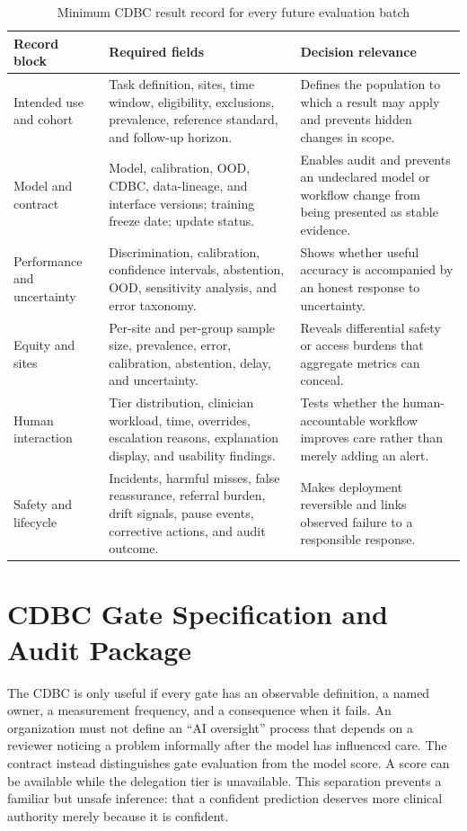 \documentclass[conference]{IEEEtran}
\begin{document}
\begin{table}[t]
\caption{Minimum CDBC result record for every future evaluation batch}
\label{tab:record}
\centering
\footnotesize
\begin{tabular}{p{}p{}p{}}
\toprule
\textbf{Record block} & \textbf{Required fields} & \textbf{Decision relevance}\\
\midrule
Intended use and cohort & Task definition, sites, time window, eligibility, exclusions, prevalence, reference standard, and follow-up horizon. & Defines the population to which a result may apply and prevents hidden changes in scope.\\
Model and contract & Model, calibration, OOD, CDBC, data-lineage, and interface versions; training freeze date; update status. & Enables audit and prevents an undeclared model or workflow change from being presented as stable evidence.\\
Performance and uncertainty & Discrimination, calibration, confidence intervals, abstention, OOD, sensitivity analysis, and error taxonomy. & Shows whether useful accuracy is accompanied by an honest response to uncertainty.\\
Equity and sites & Per-site and per-group sample size, prevalence, error, calibration, abstention, delay, and uncertainty. & Reveals differential safety or access burdens that aggregate metrics can conceal.\\
Human interaction & Tier distribution, clinician workload, time, overrides, escalation reasons, explanation display, and usability findings. & Tests whether the human-accountable workflow improves care rather than merely adding an alert.\\
Safety and lifecycle & Incidents, harmful misses, false reassurance, referral burden, drift signals, pause events, corrective actions, and audit outcome. & Makes deployment reversible and links observed failure to a responsible response.\\
\bottomrule
\end{tabular}
\end{table}

\section{CDBC Gate Specification and Audit Package}

The CDBC is only useful if every gate has an observable definition, a named owner, a measurement frequency, and a consequence when it fails. An organization must not define an ``AI oversight'' process that depends on a reviewer noticing a problem informally after the model has influenced care. The contract instead distinguishes gate evaluation from the model score. A score can be available while the delegation tier is unavailable. This separation prevents a familiar but unsafe inference: that a confident prediction deserves more clinical authority merely because it is confident.
\end{document}
